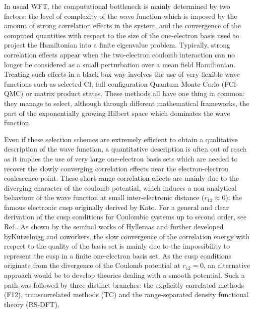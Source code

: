 \documentclass[aip,jcp,reprint,noshowkeys,superscriptaddress]{revtex4-1}
\begin{document}
In usual WFT, the computational bottleneck is mainly determined by two factors: the level of complexity of the wave function which is imposed by the amount of strong correlation effects in the system, and the convergence of the computed quantities with respect to the size of the one-electron basis used to project the Hamiltonian into a finite eigenvalue problem. 
Typically, strong correlation effects appear when the two-electron coulomb interaction can no longer be considered as a small perturbation over a mean field Hamiltonian. Treating such effects in a black box way involves the use of very flexible wave functions such as 
selected CI\cite{bender,HurMalRan-JCP-73,buenker1,buenker-book,three_class_CIPSI,harrison,cele_cipsi_3_spaces,cele_cipsi_zeroth_order,GinSceCaf-CJC-13, GinSceCaf-JCP-15, ShaHolJeaAlaUmr-JCTC-17}, 
full configuration Quantum Monte Carlo\cite{BooThoAla-JCP-09,BooAla-JCP-10,BooCleThoAla-JCP-11,GhaLozAla-JCP-19,VitAlaKat-JCTC-20} (FCI-QMC) or matrix product states\cite{ChaSha-AR-11,BaiRei-JCP-20}. These methods all have one thing in common: they manage to select, although through different mathematical frameworks, the part of the exponentially growing Hilbert space which dominates the wave function. 

Even if these selection schemes are extremely efficient to obtain a qualitative description of the wave function, a quantitative description is often out of reach as it implies the use of very large one-electron basis sets which are needed to recover the slowly converging correlation effects near the electron-electron coalescence point. 
These short-range correlation effects are mainly due to the diverging character of the coulomb potential, which induces a non analytical behaviour of the wave function at small inter-electronic distance ($r_{12}\approx 0$): the famous electronic cusp originally derived by Kato\cite{Kat-CPAM-57}. For a general and clear derivation of the cusp conditions for Coulombic systems up to second order, see Ref.. As shown by the seminal works of Hylleraas\cite{Hyl-ZP-29} and further developed byKutzelnigg and coworkers, \cite{Kut-TCA-85,KutKlo-JCP-91, NogKut-JCP-94} the slow convergence of the correlation energy with respect to the quality of the basis set is mainly due to the impossibility to represent the cusp in a finite one-electron basis set. 
As the cusp conditions originate from the divergence of the Coulomb potential at $r_{12}=0$, an alternative approach would be to develop theories dealing with a smooth potential. Such a path was followed by three distinct branches: 
the explicitly correlated methods (F12), transcorrelated methods (TC) and the range-separated density functional theory (RS-DFT). 
\end{document}
